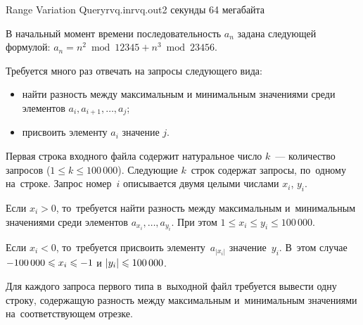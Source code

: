 \newcommand*{\hm}[1]{#1\nobreak\discretionary{}{\hbox{$\mathsurround=0pt #1$}}{}}

\begin{problem}{Range Variation Query}{rvq.in}{rvq.out}{2 секунды}
{64 мегабайта}

В начальный момент времени последовательность $a_n$ задана следующей формулой:
$a_n = n^2 \bmod 12345 + n^3 \bmod 23456$.

Требуется много раз отвечать на запросы следующего вида:
\begin{itemize}
\item найти разность между максимальным и минимальным значениями
среди элементов $a_i, a_{i+1}, \ldots, a_j$;
\item присвоить элементу $a_i$ значение $j$.
\end{itemize}

\InputFile
Первая строка входного файла содержит натуральное число $k$~--- количество запросов ($1 \leqslant k \leqslant 100\,000$).
Следующие $k$~строк содержат запросы, по~одному на~строке. Запрос номер~$i$ описывается
двумя целыми числами $x_i$, $y_i$.

Если $x_i > 0$, то~требуется найти разность между максимальным и~минимальным
значениями среди элементов $a_{x_i}, \ldots, a_{y_i}$. При этом $1 \leqslant x_i \leqslant y_i \leqslant 100\,000$.

Если $x_i < 0$, то~требуется присвоить элементу~$a_{|x_i|}$ значение~$y_i$.
В~этом случае $-100\,000 \hm\leqslant x_i \hm\leqslant -1$ и $|y_i| \hm\leqslant 100\,000$.

\OutputFile
Для каждого запроса первого типа в~выходной файл требуется вывести одну строку,
содержащую разность между максимальным и~минимальным значениями на~соответствующем
отрезке.

\Examples

\begin{example}
%
\end{example}

\end{problem}

